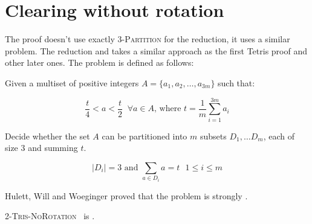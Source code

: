 \section{Clearing without rotation}

The proof doesn't use exactly \textsc{3-Partition} for the reduction, it uses a similar problem. The reduction and takes a similar approach as the first Tetris proof\cite{TIH} and other later ones\cite{TT, TWFP, TCB, CTV}. The problem is defined as follows:
\vspace{1em}

\begin{problem}
  
 Given a multiset of positive integers $A = \{ a_1, a_2, \dots, a_{3m} \}$ such that:

$$ \frac{t}{4} < a < \frac{t}{2}\;\; \forall a \in A \text{, where } t = \frac{1}{m} \sum_{i=1}^{3m} a_i $$ 

 Decide whether the set $A$ can be partitioned into $m$ subsets $D_1, \dots D_m$, each of size $3$ and summing $t$. 

$$ | D_i | = 3 \text{ and } \sum_{a \in D_i} a = t\text{   } 1 \leq i \leq m$$
\end{problem}

Hulett, Will and Woeginger\cite{3PART} proved that the problem is strongly \nph.

\begin{theorem} 
  \textsc{2-{Tris-NoRotation}} \clearing\ is \npc.
\end{theorem}

